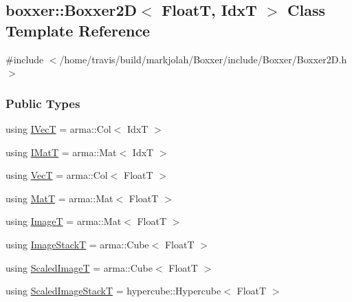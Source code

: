 \hypertarget{classboxxer_1_1Boxxer2D}{}\subsection{boxxer\+:\+:Boxxer2D$<$ FloatT, IdxT $>$ Class Template Reference}
\label{classboxxer_1_1Boxxer2D}


{\ttfamily \#include $<$/home/travis/build/markjolah/\+Boxxer/include/\+Boxxer/\+Boxxer2\+D.\+h$>$}

\subsubsection*{Public Types}
\begin{DoxyCompactItemize}
\item 
using \hyperlink{classboxxer_1_1Boxxer2D_acb4dc89c7e1bd2099e7de7b83621ba4f}{I\+VecT} = arma\+::\+Col$<$ IdxT $>$
\item 
using \hyperlink{classboxxer_1_1Boxxer2D_ad6e571d3e7685b8c634661e03382a32f}{I\+MatT} = arma\+::\+Mat$<$ IdxT $>$
\item 
using \hyperlink{classboxxer_1_1Boxxer2D_aeb45bfe57b8975660fc7076a2794acf8}{VecT} = arma\+::\+Col$<$ FloatT $>$
\item 
using \hyperlink{classboxxer_1_1Boxxer2D_a4af9f3e10a7ceb1c20e1d731263d9aeb}{MatT} = arma\+::\+Mat$<$ FloatT $>$
\item 
using \hyperlink{classboxxer_1_1Boxxer2D_ad1c52f05a957159bf373b4d8c4361ffe}{ImageT} = arma\+::\+Mat$<$ FloatT $>$
\item 
using \hyperlink{classboxxer_1_1Boxxer2D_a35da86be183f5f24cb3d13cbf7cf45ee}{Image\+StackT} = arma\+::\+Cube$<$ FloatT $>$
\item 
using \hyperlink{classboxxer_1_1Boxxer2D_ad8d3ac7a59998612e4ce00500416c8c1}{Scaled\+ImageT} = arma\+::\+Cube$<$ FloatT $>$
\item 
using \hyperlink{classboxxer_1_1Boxxer2D_a2937a772edcf9cec5f617fbcf1d8a6fe}{Scaled\+Image\+StackT} = hypercube\+::\+Hypercube$<$ FloatT $>$
\end{DoxyCompactItemize}

